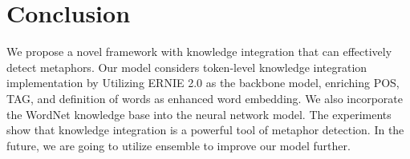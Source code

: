 \documentclass[11pt,a4paper]{article}
\begin{document}
\section{Conclusion}
We propose a novel framework with knowledge integration that can effectively detect metaphors. Our model considers token-level knowledge integration implementation by Utilizing ERNIE 2.0 as the backbone model, enriching POS, TAG, and definition of words as enhanced word embedding. We also incorporate the WordNet knowledge base into the neural network model. The experiments show that knowledge integration is a powerful tool of metaphor detection. In the future, we are going to utilize ensemble to improve our model further.





\end{document}

